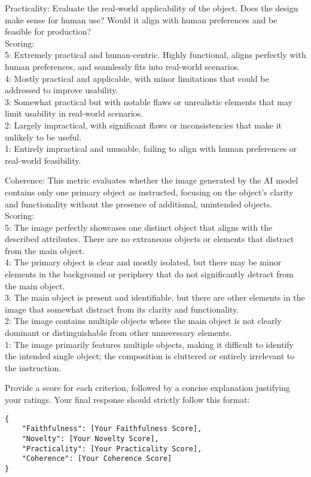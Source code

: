 \begin{tcolorbox}[colback=gray!10, colframe=black, title=Prompt for Absolute Automatic Evaluation]
Practicality: Evaluate the real-world applicability of the object. Does the design make sense for human use? Would it align with human preferences and be feasible for production?\\
Scoring:\\
5: Extremely practical and human-centric. Highly functional, aligns perfectly with human preferences, and seamlessly fits into real-world scenarios.\\
4: Mostly practical and applicable, with minor limitations that could be addressed to improve usability.\\
3: Somewhat practical but with notable flaws or unrealistic elements that may limit usability in real-world scenarios.\\
2: Largely impractical, with significant flaws or inconsistencies that make it unlikely to be useful.\\
1: Entirely impractical and unusable, failing to align with human preferences or real-world feasibility.\\
\end{tcolorbox}

\begin{tcolorbox}[colback=gray!10, colframe=black, title=Prompt for Absolute Automatic Evaluation (continued)]
Coherence: This metric evaluates whether the image generated by the AI model contains only one primary object as instructed, focusing on the object's clarity and functionality without the presence of additional, unintended objects.\\
Scoring:\\
5: The image perfectly showcases one distinct object that aligns with the described attributes. There are no extraneous objects or elements that distract from the main object.\\
4: The primary object is clear and mostly isolated, but there may be minor elements in the background or periphery that do not significantly detract from the main object.\\
3: The main object is present and identifiable, but there are other elements in the image that somewhat distract from its clarity and functionality.\\
2: The image contains multiple objects where the main object is not clearly dominant or distinguishable from other unnecessary elements.\\
1: The image primarily features multiple objects, making it difficult to identify the intended single object; the composition is cluttered or entirely irrelevant to the instruction.

Provide a score for each criterion, followed by a concise explanation justifying your ratings. Your final response should strictly follow this format: 
\begin{verbatim}
{
    "Faithfulness": [Your Faithfulness Score],
    "Novelty": [Your Novelty Score],
    "Practicality": [Your Practicality Score],
    "Coherence": [Your Coherence Score]
}

\end{verbatim}
\label{app:absolute-prompt}
\end{tcolorbox}

